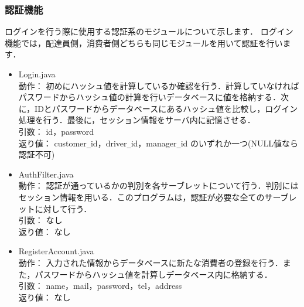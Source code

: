 \documentclass[a4j,titlepage]{jarticle}
\begin{document}
\subsubsection{認証機能}
ログインを行う際に使用する認証系のモジュールについて示します．
ログイン機能では，配達員側，消費者側どちらも同じモジュールを用いて認証を行います．
\begin{itemize}
\item Login.java\\
  動作： 初めにハッシュ値を計算しているか確認を行う．計算していなければパスワードからハッシュ値の計算を行いデータベースに値を格納する．次に，IDとパスワードからデータベースにあるハッシュ値を比較し，ログイン処理を行う．最後に，セッション情報をサーバ内に記憶させる．\\
  引数： id，password\\
  返り値： customer\verb|_|id，driver\verb|_|id，manager\verb|_|id のいずれか一つ(NULL値なら認証不可)
\item AuthFilter.java\\
  動作： 認証が通っているかの判別を各サーブレットについて行う．判別にはセッション情報を用いる．このプログラムは，認証が必要な全てのサーブレットに対して行う．\\
  引数： なし\\
  返り値： なし
\item RegisterAccount.java\\
  動作： 入力された情報からデータベースに新たな消費者の登録を行う．また，パスワードからハッシュ値を計算しデータベース内に格納する．\\
  引数： name，mail，password，tel，address\\
  返り値： なし
\end{itemize}
\end{document}
